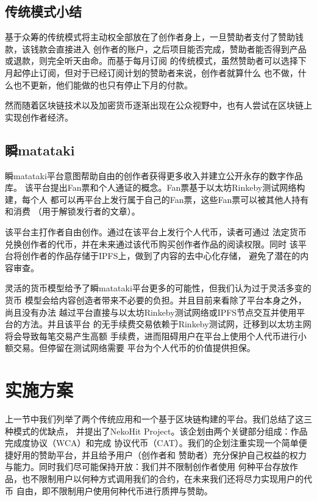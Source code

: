 \documentclass[11pt,UTF8,a4paper]{ctexart}
\begin{document}
    \subsection{传统模式小结}\label{subsec:tradition_summary}

    基于众筹的传统模式将主动权全部放在了创作者身上，一旦赞助者支付了赞助钱款，该钱款会直接进入
    创作者的账户，之后项目能否完成，赞助者能否得到产品或退款，则完全听天由命。而基于每月订阅
    的传统模式，虽然赞助者可以选择下月起停止订阅，但对于已经订阅计划的赞助者来说，创作者就算什么
    也不做，什么也不更新，他们能做的也只有停止下月的付款。

    然而随着区块链技术以及加密货币逐渐出现在公众视野中，也有人尝试在区块链上实现创作者经济。

    \subsection{瞬matataki}\label{subsec:blockchain_matataki}

    瞬matataki平台意图帮助自由的创作者获得更多收入并建立公开永存的数字作品库。
    该平台提出Fan票和个人通证的概念。Fan票基于以太坊Rinkeby测试网络构建，每个人
    都可以再平台上发行属于自己的Fan票，这些Fan票可以被其他人持有和消费
    （用于解锁发行者的文章）\cite{mitataki_fan_ticket}。

    该平台主打作者自由创作。通过在该平台上发行个人代币，读者可通过
    法定货币兑换创作者的代币，并在未来通过该代币购买创作者作品的阅读权限。同时
    该平台将创作者的作品存储于IPFS\cite{ipfs}上，做到了内容的去中心化存储，
    避免了潜在的内容审查。

    灵活的货币模型给予了瞬matataki平台更多的可能性，但我们认为过于灵活多变的货币
    模型会给内容创造者带来不必要的负担。并且目前来看除了平台本身之外，尚且没有办法
    越过平台直接与以太坊Rinkeby测试网络或IPFS节点交互并使用平台的方法。并且该平台
    的无手续费交易依赖于Rinkeby测试网，迁移到以太坊主网将会导致每笔交易产生高额
    手续费，进而阻碍用户在平台上使用个人代币进行小额交易。但停留在测试网络需要
    平台为个人代币的价值提供担保。


    \section{实施方案}\label{sec:solution}

    上一节中我们列举了两个传统应用和一个基于区块链构建的平台。我们总结了这三种模式的优缺点，
    并提出了NekoHit Project。该企划由两个关键部分组成：作品完成度协议（WCA）和完成
    协议代币（CAT）。我们的企划注重实现一个简单便捷好用的赞助平台，并且给予用户（创作者和
    赞助者）充分保护自己权益的权力与能力。同时我们尽可能保持开放：我们并不限制创作者使用
    何种平台存放作品，也不限制用户以何种方式调用我们的合约，在未来我们还将尽力实现用户的代币
    自由，即不限制用户使用何种代币进行质押与赞助。
\end{document}
